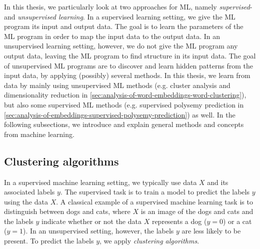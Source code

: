 In this thesis, we particularly look at two approaches for ML, namely \textit{supervised}- and \textit{unsupervised learning}. In a supervised learning setting, we give the ML program its input and output data. The goal is to learn the parameters of the ML program in order to map the input data to the output data. In an unsupervised learning setting, however, we do not give the ML program any output data, leaving the ML program to find structure in its input data. The goal of unsupervised ML programs are to discover and learn hidden patterns from the input data, by applying (possibly) several methods. In this thesis, we learn from data by mainly using unsupervised ML methods (e.g. cluster analysis and dimensionality reduction in \cref{sec:analysis-of-word-embeddings-word-clustering}), but also some supervised ML methods (e.g. supervised polysemy prediction in \cref{sec:analysis-of-embeddings-supervised-polysemy-prediction}) as well. In the following subsections, we introduce and explain general methods and concepts from machine learning.

\subsection{Clustering algorithms}
\label{sec:clustering-algorithms}
In a supervised machine learning setting, we typically use data $X$ and its associated labels $y$. The supervised task is to train a model to predict the labels $y$ using the data $X$. A classical example of a supervised machine learning task is to distinguish between dogs and cats, where $X$ is an image of the dogs and cats and the labels $y$ indicate whether or not the data $X$ represents a dog ($y=0$) or a cat ($y=1$). In an unsupervised setting, however, the labels $y$ are less likely to be present. To predict the labels $y$, we apply \textit{clustering algorithms}.

